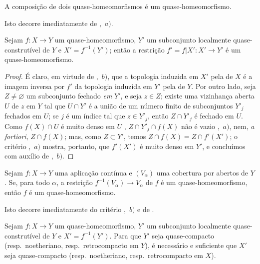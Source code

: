 \begin{corollary}[10.2.3]
\label{IV.10.2.3}
A composição de dois quase-homeomorfismos é um quase-homeomorfismo.
\end{corollary}

Isto decorre imediatamente de ,~$a)$.

\begin{corollary}[10.2.4]
\label{IV.10.2.4}
Sejam $f:X\to Y$ um quase-homeomorfismo, $Y'$ um subconjunto localmente quase-construtível de $Y$ e $X'=f^{-1}(Y')$; então a restrição $f'=f|X':X'\to Y'$ é um quase-homeomorfismo.
\end{corollary}

\begin{proof}
É claro, em virtude de ,~$b)$, que a topologia induzida em $X'$ pela de $X$ é a imagem inversa por $f'$ da topologia induzida em $Y'$ pela de $Y$.
Por outro lado,
seja $Z\neq\varnothing$ um subconjunto fechado \emph{em} $Y'$, e seja $z\in Z$; existe uma vizinhança aberta $U$ de $z$ em $Y$ tal que $U\cap Y'$ é a união de um número finito de subconjuntos $Y'_j$ fechados em $U$; se $j$ é um índice tal que $z\in Y'_j$, então $Z\cap Y'_j$ é fechado em $U$.
Como $f(X)\cap U$ é muito denso em $U$ , $Z\cap Y'_j\cap f(X)$ não é vazio ,~$a)$, nem, \emph{a fortiori}, $Z\cap f(X)$; mas, como $Z\subset Y'$, temos $Z\cap f(X)=Z\cap f'(X')$; o critério ,~$a)$ mostra, portanto, que $f'(X')$ é muito denso em $Y'$, e concluímos com auxílio de ,~$b)$.
\end{proof}

\begin{corollary}[10.2.5]
\label{IV.10.2.5}
Sejam $f:X\to Y$ uma aplicação contínua e $(V_\alpha)$ uma cobertura por abertos de $Y$.
Se, para todo $\alpha$, a restrição $f^{-1}(V_\alpha)\to V_\alpha$ de $f$ é um quase-homeomorfismo, então $f$ é um quase-homeomorfismo.
\end{corollary}

Isto decorre imediatamente do critério ,~$b)$ e de .

\begin{corollary}[10.2.6]
\label{IV.10.2.6}
Sejam $f:X\to Y$ um quase-homeomorfismo, $Y'$ um subconjunto localmente quase-construtível de $Y$ e $X'=f^{-1}(Y')$.
Para que $Y'$ seja quase-compacto (resp.\ noetheriano, resp.\ retrocompacto em $Y$), é necessário e suficiente que $X'$ seja quase-compacto (resp.\ noetheriano, resp.\ retrocompacto em $X$).
\end{corollary}

